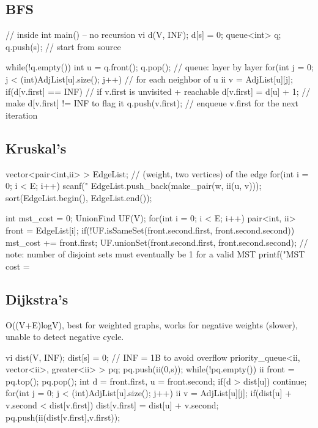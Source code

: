 \documentclass{article}
\begin{document}
\subsection{BFS}
\begin{mylisting}{}
// inside int main() -- no recursion
vi d(V, INF); d[s] = 0;
queue<int> q; q.push(s); // start from source

while(!q.empty()){
	int u = q.front(); q.pop();	// queue: layer by layer
	for(int j = 0; j < (int)AdjList[u].size(); j++){ // for each neighbor of u
		ii v = AdjList[u][j];
		if(d[v.first] == INF){ // if v.first is unvisited + reachable
			d[v.first] = d[u] + 1;	// make d[v.first] != INF to flag it
			q.push(v.first);	// enqueue v.first for the next iteration
		}
	}
}
\end{mylisting}

\subsection{Kruskal's}
\begin{mylisting}{}
vector<pair<int,ii> > EdgeList;	// (weight, two vertices) of the edge
for(int i = 0; i < E; i++){
	scanf("%
	EdgeList.push_back(make_pair(w, ii(u, v)));
}
sort(EdgeList.begin(), EdgeList.end());

int mst_cost = 0;
UnionFind UF(V);
for(int i = 0; i < E; i++){
	pair<int, ii> front = EdgeList[i];
	if(!UF.isSameSet(front.second.first, front.second.second)){
		mst_cost += front.first;
		UF.unionSet(front.second.first, front.second.second);
	}
} // note: number of disjoint sets must eventually be 1 for a valid MST
printf("MST cost = %
\end{mylisting}

\subsection{Dijkstra's}
O((V+E)logV), best for weighted graphs, works for negative weights (slower), unable to detect negative cycle.
\begin{mylisting}{}
vi dist(V, INF); dist[s] = 0;		// INF = 1B to avoid overflow
priority_queue<ii, vector<ii>, greater<ii> > pq; pq.push(ii(0,s));
while(!pq.empty()){
	ii front = pq.top(); pq.pop();	
	int d = front.first, u = front.second;
	if(d > dist[u]) continue;		
	for(int j = 0; j < (int)AdjList[u].size(); j++){
		ii v = AdjList[u][j];	
		if(dist[u] + v.second < dist[v.first]){
			dist[v.first] = dist[u] + v.second;	
			pq.push(ii(dist[v.first],v.first));
		}
	}
}
\end{mylisting}
\end{document}

